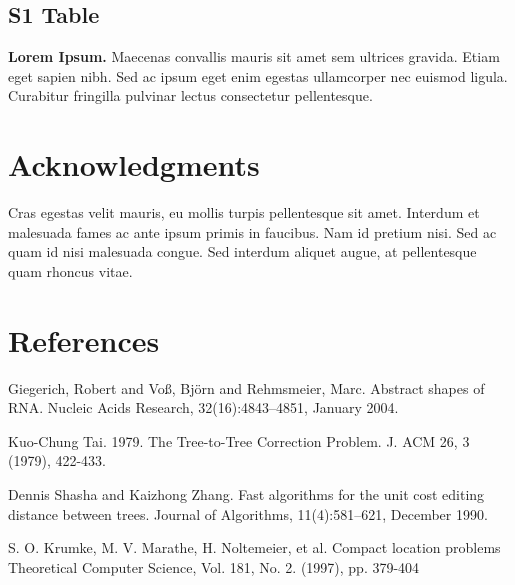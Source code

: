 \documentclass[10pt,letterpaper]{article}
\begin{document}
\subsection*{S1 Table}
\label{S1_Table}
{\bf Lorem Ipsum.} Maecenas convallis mauris sit amet sem ultrices gravida. Etiam eget sapien nibh. Sed ac ipsum eget enim egestas ullamcorper nec euismod ligula. Curabitur fringilla pulvinar lectus consectetur pellentesque.

\section*{Acknowledgments}
Cras egestas velit mauris, eu mollis turpis pellentesque sit amet. Interdum et malesuada fames ac ante ipsum primis in faucibus. Nam id pretium nisi. Sed ac quam id nisi malesuada congue. Sed interdum aliquet augue, at pellentesque quam rhoncus vitae.

\nolinenumbers

\section*{References}
% 
%
%

\begin{thebibliography}{10}
Giegerich, Robert and Vo{\ss}, Bj\"{o}rn and Rehmsmeier, Marc. Abstract shapes
    of RNA. Nucleic Acids Research, 32(16):4843–4851, January 2004.

Kuo-Chung Tai. 1979. The Tree-to-Tree Correction Problem. J. ACM 26, 3 (1979), 422-433.



Dennis Shasha and Kaizhong Zhang. Fast algorithms for the unit cost
    editing distance between trees. Journal of Algorithms, 11(4):581–621,
    December 1990.


 S. O. Krumke, M. V. Marathe, H. Noltemeier, et al. Compact location problems Theoretical Computer Science, Vol. 181, No. 2. (1997), pp. 379-404
\end{thebibliography}
\end{document}
